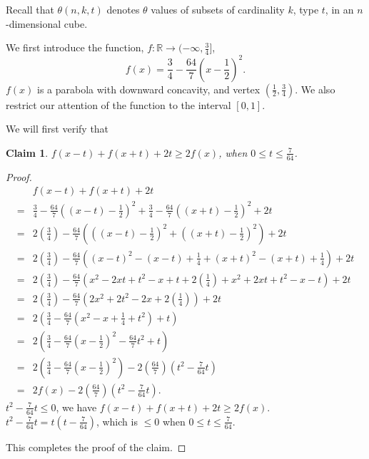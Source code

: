\documentclass[12pt]{ucthesis}
\theoremstyle{plain}
\newtheorem{claim}{Claim}
\theoremstyle{definition}
\begin{document}
Recall that $\theta(n, k, t)$ denotes $\theta$ values of subsets of cardinality $k$,
type $t$, in an $n$-dimensional cube.

We first introduce the function,
$f \colon \mathbb{R} \rightarrow (-\infty, \frac{3}{4}]$,
\begin{equation*}
f(x) = \frac{3}{4} - \frac{64}{7} (x - \frac{1}{2})^2.
\end{equation*}
$f(x)$ is a parabola with downward concavity, and vertex $(\frac{1}{2}, \frac{3}{4})$.
We also restrict our attention of the function to the interval $[0, 1]$.

We will first verify that
\begin{claim}
\label{Claim 5}
$f(x - t) + f(x + t) + 2 t \ge 2 f(x)$, when $0 \le t \le \frac{7}{64}$.
\end{claim}
\begin{proof}
\begin{align*}
  & f(x - t) + f(x + t) + 2 t \\
= & \frac{3}{4} - \frac{64}{7} ((x - t) - \frac{1}{2})^2 +
    \frac{3}{4} - \frac{64}{7} ((x + t) - \frac{1}{2})^2 + 2 t \\
= & 2 (\frac{3}{4}) - \frac{64}{7} \left(((x - t) - \frac{1}{2})^2 +
    ((x + t) - \frac{1}{2})^2\right) + 2 t \\
= & 2 (\frac{3}{4}) - \frac{64}{7} \left((x - t)^2 - (x - t) + \frac{1}{4} +
    (x + t)^2 - (x + t) + \frac{1}{4}\right) + 2 t \\
= & 2 (\frac{3}{4}) - \frac{64}{7} (x^2 - 2 x t + t^2 - x + t + 2 (\frac{1}{4}) +
    x^2 + 2 x t + t^2 - x - t) + 2 t \\
= & 2 (\frac{3}{4}) - \frac{64}{7} (2 x^2 + 2 t^2 - 2 x + 2 (\frac{1}{4})) + 2 t \\
= & 2 (\frac{3}{4} - \frac{64}{7} (x^2 - x + \frac{1}{4} + t^2) + t) \\
= & 2 (\frac{3}{4} - \frac{64}{7} (x - \frac{1}{2})^2 - \frac{64}{7} t^2 + t) \\
= & 2 (\frac{3}{4} - \frac{64}{7} (x - \frac{1}{2})^2) - 2 (\frac{64}{7}) (t^2 - \frac{7}{64} t) \\
= & 2 f(x) - 2 (\frac{64}{7}) (t^2 - \frac{7}{64} t).
\end{align*}
$t^2 - \frac{7}{64} t \le 0$, we have $f(x - t) + f(x + t) + 2 t \ge 2 f(x)$. \\
$t^2 - \frac{7}{64} t = t (t - \frac{7}{64})$, which is $\le 0$ when $0 \le t \le \frac{7}{64}$.

This completes the proof of the claim.
\end{proof}
\end{document}
